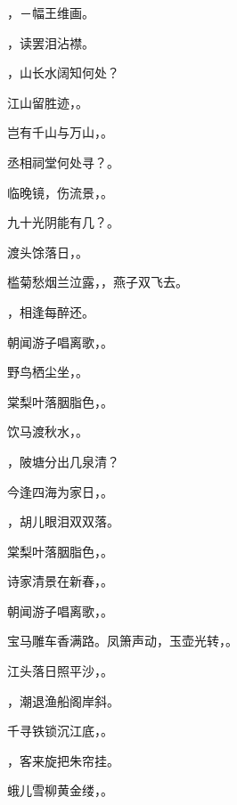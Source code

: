 \documentclass[12pt, a4paper, addpoints]{exam}
\begin{document}
\begin{questions}
\question[1] \uline{\qquad\qquad\qquad}，－幅王维画。

\question[1] \uline{\qquad\qquad\qquad}，读罢泪沾襟。

\question[1] \uline{\qquad\qquad\qquad}，山长水阔知何处？

\question[1] 江山留胜迹，\uline{\qquad\qquad\qquad}。

\question[1] 岂有千山与万山，\uline{\qquad\qquad\qquad}。

\question[1] 丞相祠堂何处寻？\uline{\qquad\qquad\qquad}。

\question[1] 临晚镜，伤流景，\uline{\qquad\qquad\qquad}。

\question[1] 九十光阴能有几？\uline{\qquad\qquad\qquad}。

\question[1] 渡头馀落日，\uline{\qquad\qquad\qquad}。

\question[1] 槛菊愁烟兰泣露，\uline{\qquad\qquad\qquad}，燕子双飞去。

\question[1] \uline{\qquad\qquad\qquad}，相逢每醉还。

\question[1] 朝闻游子唱离歌，\uline{\qquad\qquad\qquad}。

\question[1] 野鸟栖尘坐，\uline{\qquad\qquad\qquad}。

\question[1] 棠梨叶落胭脂色，\uline{\qquad\qquad\qquad}。

\question[1] 饮马渡秋水，\uline{\qquad\qquad\qquad}。

\question[1] \uline{\qquad\qquad\qquad}，陂塘分出几泉清？

\question[1] 今逢四海为家日，\uline{\qquad\qquad\qquad}。

\question[1] \uline{\qquad\qquad\qquad}，胡儿眼泪双双落。

\question[1] 棠梨叶落胭脂色，\uline{\qquad\qquad\qquad}。

\question[1] 诗家清景在新春，\uline{\qquad\qquad\qquad}。

\question[1] 朝闻游子唱离歌，\uline{\qquad\qquad\qquad}。

\question[1] 宝马雕车香满路。凤箫声动，玉壶光转，\uline{\qquad\qquad\qquad}。

\question[1] 江头落日照平沙，\uline{\qquad\qquad\qquad}。

\question[1] \uline{\qquad\qquad\qquad}，潮退渔船阁岸斜。

\question[1] 千寻铁锁沉江底，\uline{\qquad\qquad\qquad}。

\question[1] \uline{\qquad\qquad\qquad}，客来旋把朱帘挂。

\question[1] 蛾儿雪柳黄金缕，\uline{\qquad\qquad\qquad}。


\end{questions}
\end{document}
